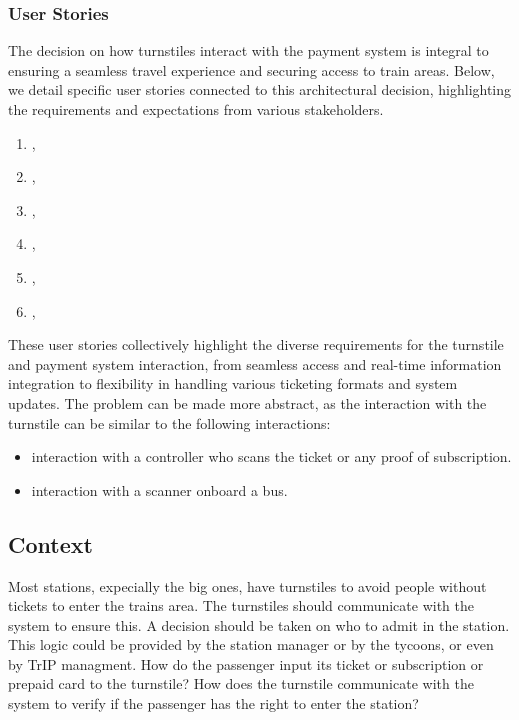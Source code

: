 \subsubsection*{User Stories}
The decision on how turnstiles interact with the payment system is integral to ensuring a seamless travel experience and securing access to train areas. Below, we detail specific user stories connected to this architectural decision, highlighting the requirements and expectations from various stakeholders.

\begin{enumerate}[noitemsep]
    \item \userStoryOne,
    \item \userStoryTwo,
    \item \userStorySixteen,
    \item \userStoryTwentySix,
    \item \userStoryTwentySeven,
    \item \userStoryTwentyThree,
\end{enumerate}

These user stories collectively highlight the diverse requirements for the turnstile and payment system interaction, from seamless access and real-time information integration to flexibility in handling various ticketing formats and system updates.
The problem can be made more abstract, as the interaction with the turnstile can be similar to the following interactions:
\begin{itemize}
    \item interaction with a controller who scans the ticket or any proof of subscription.
    \item interaction with a scanner onboard a bus.
\end{itemize}

\subsection*{Context}

Most stations, expecially the big ones, have turnstiles to avoid people without tickets to enter the trains area.
The turnstiles should communicate with the system to ensure this. A decision should be taken on who to admit in the station.
This logic could be provided by the station manager or by the tycoons, or even by TrIP managment.
How do the passenger input its ticket or subscription or prepaid card to the turnstile?
How does the turnstile communicate with the system to verify if the passenger has the right to enter the station?

